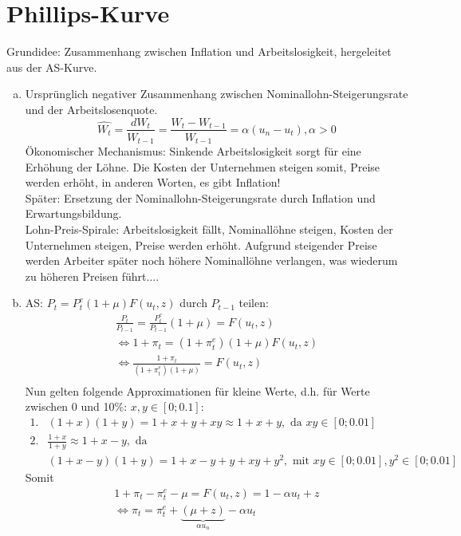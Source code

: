 \documentclass{scrartcl}
\begin{document}
\section{Phillips-Kurve}
Grundidee: Zusammenhang zwischen Inflation und Arbeitslosigkeit, hergeleitet aus der AS-Kurve.
\begin{enumerate}[a)]
  \item Urspr\"{u}nglich negativer Zusammenhang zwischen Nominallohn-Steigerungsrate und der Arbeitslosenquote. $$ \hat{W_t} =  \frac{dW_t}{W_{t-1}} =  \frac{W_t-W_{t-1}}{W_{t-1}} = \alpha (u_{n}-u_t), \alpha >0$$
  \"{O}konomischer Mechanismus: Sinkende Arbeitslosigkeit sorgt f\"{u}r eine Erh\"{o}hung der L\"{o}hne. Die Kosten der Unternehmen steigen somit, Preise werden erh\"{o}ht, in anderen Worten, es gibt Inflation!\\
  Sp\"{a}ter: Ersetzung der Nominallohn-Steigerungsrate durch Inflation und Erwartungsbildung.\\
  Lohn-Preis-Spirale: Arbeitslosigkeit f\"{a}llt, Nominall\"{o}hne steigen, Kosten der Unternehmen steigen, Preise werden erh\"{o}ht. Aufgrund steigender Preise werden Arbeiter sp\"{a}ter noch h\"{o}here Nominall\"{o}hne verlangen, was wiederum zu h\"{o}heren Preisen f\"{u}hrt....
  \item AS: $P_t = P_t^e(1+\mu)F(u_t,z)$ durch $P_{t-1}$ teilen:
  \begin{align*}
    \frac{P_t}{P_{t-1}} = \frac{P_t^e}{P_{t-1}} (1+\mu) = F(u_t,z)\\
    \Leftrightarrow 1+\pi_t = (1+\pi_t^e) (1+\mu) F(u_t,z) \\
    \Leftrightarrow \frac{1+\pi_t}{(1+\pi_t^e) (1+\mu)} = F(u_t,z)\\
  \end{align*}
  Nun gelten folgende Approximationen f\"{u}r kleine Werte, d.h. f\"{u}r Werte zwischen 0 und 10\%: $x,y \in [0;0.1]:$
  \begin{align*}
    1.& (1+x)(1+y) = 1+x+y +xy \approx 1+x+y, \text{ da } xy \in[0;0.01]\\
    2.& \frac{1+x}{1+y} \approx 1+x -y, \text{ da }\\ &(1+x-y)(1+y)=1+x-y+y+xy +y^2, \text{ mit } xy \in[0;0.01], y^2 \in[0;0.01]
  \end{align*}
  Somit
  \begin{align*}
    1 + \pi_t - \pi_t^e - \mu = F(u_t,z) = 1-\alpha u_t + z\\
    \Leftrightarrow \pi_t = \pi_t^e + \underbrace{(\mu+z)}_{\alpha u_n} - \alpha u_t
  \end{align*}

\end{enumerate}
\end{document}
